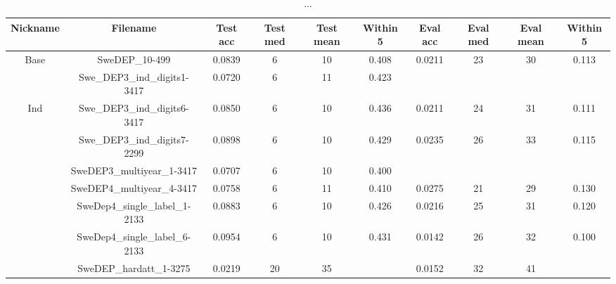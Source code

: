 
\begin{table}
  \begin{tabular}{|c|c|c|c|c|c|c|c|c|c|}
    \hline
    Nickname & Filename & Test acc & Test med & Test mean & Within 5 & Eval acc & Eval med & Eval mean & Within 5 \\
    \hline
    Base & SweDEP_10-499 & 0.0839 & 6 & 10 & 0.408 & 0.0211 & 23 & 30 & 0.113 \\
    & Swe_DEP3_ind_digits1-3417 & 0.0720 & 6 & 11 & 0.423 &  &  &  & \\
    \hline
    Ind & Swe_DEP3_ind_digits6-3417 & 0.0850 & 6 & 10 & 0.436 & 0.0211 & 24 & 31 & 0.111 \\
    & Swe_DEP3_ind_digits7-2299 & 0.0898 & 6 & 10 & 0.429 & 0.0235 & 26 & 33 & 0.115 \\
    \hline
    & SweDEP3_multiyear_1-3417 & 0.0707 & 6 & 10 & 0.400 &  &  &  & \\
    & SweDEP4_multiyear_4-3417 & 0.0758 & 6 & 11 & 0.410 & 0.0275 & 21 & 29 & 0.130 \\
    \hline
    & SweDep4_single_label_1-2133 & 0.0883 & 6 & 10 & 0.426 & 0.0216 & 25 & 31 & 0.120 \\
    & SweDep4_single_label_6-2133 & 0.0954 & 6 & 10 & 0.431 & 0.0142 & 26 & 32 & 0.100 \\
    \hline
    & SweDEP_hardatt_1-3275 & 0.0219 & 20 & 35 &  & 0.0152 & 32 & 41 & \\
    \hline
  \end{tabular}
  \caption{...}
  \label{tab:model_overview}
\end{table}
